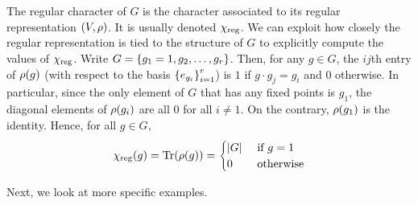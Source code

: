 \begin{boxexample}\label{Ch2:Eg:Reg_Char_Vals}
    The regular character of $G$ is the character associated to its regular representation $\left( V, \rho \right)$. It is usually denoted $\chi_{\operatorname{reg}}$. We can exploit how closely the regular representation is tied to the structure of $G$ to explicitly compute the values of $\chi_{\operatorname{reg}}$. Write $G = \left\{ g_1 = 1, g_2, \ldots, g_r \right\}$. Then, for any $g \in G$, the $ij$th entry of $\rho\!\left( g \right)$ (with respect to the basis $\left\{ e_{g_i} \right\}_{i=1}^{r}$) is $1$ if $g \cdot g_j = g_i$ and $0$ otherwise. In particular, since the only element of $G$ that has any fixed points is $g_1$, the diagonal elements of $\rho\!\left( g_i \right)$ are all $0$ for all $i \neq 1$. On the contrary, $\rho\!\left( g_1 \right)$ is the identity. Hence, for all $g \in G$,
    \begin{align}
        \chi_{\operatorname{reg}}\!\left( g \right) = \operatorname{Tr}\!\left( \rho\!\left( g \right) \right) = \begin{cases}
            \left\lvert G \right\rvert & \text{ if } g = 1 \\
            0 & \text{ otherwise}
        \end{cases}
        \label{Ch2:Eq:Reg_Char_Vals}
    \end{align}
\end{boxexample}

Next, we look at more specific examples.

